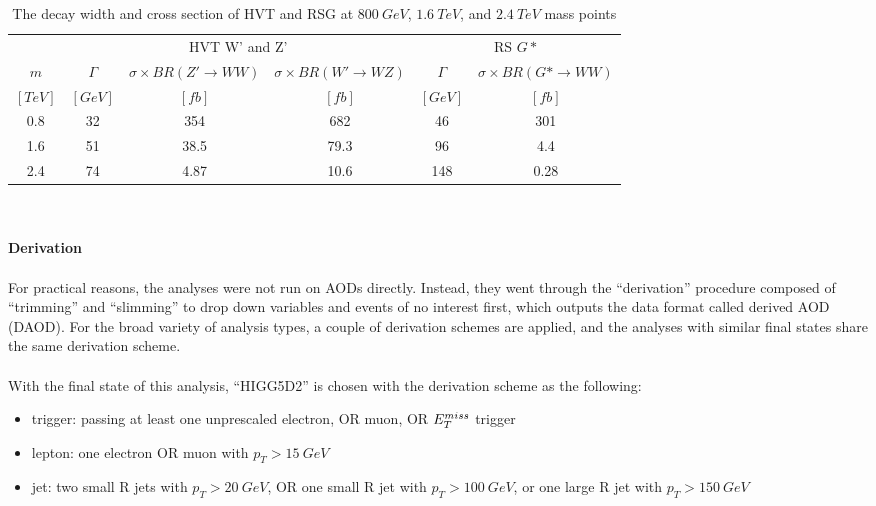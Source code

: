 \begin{table}[htb]
	\caption{The decay width and cross section of HVT and RSG at $800~GeV$, $1.6~TeV$, and $2.4~TeV$ mass points}
	\centering
		\begin{tabular}{|c|ccc|cc|}
          \hline
          \hline
                   & \multicolumn{3}{c|}{ HVT W' and Z' }                                     & \multicolumn{2}{c|}{ RS $G*$}  \\
              $m$  & $\Gamma$ & $\sigma \times BR(Z' \to WW)$ & $\sigma \times BR(W' \to WZ)$ & $\Gamma$ & $\sigma \times BR(G* \to WW)$ \\
            $[TeV]$& $[GeV]$  & $[fb]$                        & $[fb]$                        & $[GeV]$  & $[fb]$      \\
          \hline
               0.8 & 32       & 354                           & 682                           & 46       & 301   \\
               1.6 & 51       & 38.5                          & 79.3                          & 96       & 4.4 \\
               2.4 & 74       & 4.87                          & 10.6                          & 148      & 0.28 \\
          \hline
         \end{tabular}
	\label{Tab:xs_decaywidth}
\end{table}
\noindent
\\
\\{\bf Derivation}
\\
\\For practical reasons, the analyses were not run on AODs directly. Instead, they went through the ``derivation'' procedure composed of ``trimming'' and ``slimming'' to drop down variables and events of no interest first\cite{Borodin:2015wqa}, which outputs the data format called derived AOD (DAOD). For the broad variety of analysis types, a couple of derivation schemes are applied, and the analyses with similar final states share the same derivation scheme. 
\\
\\With the final state of this analysis, ``HIGG5D2'' is chosen with the derivation scheme as the following:
\begin{itemize}
  \item trigger: passing at least one unprescaled electron, OR muon, OR $E_{T}^{miss}$ trigger
  \item lepton: one electron OR muon with $p_{T}>15~GeV$ 
  \item jet: two small R jets with $p_{T}>20~GeV$, OR one  small R jet with $p_{T}>100~GeV$, or one large R jet with $p_{T}>150~GeV$
\end{itemize}
